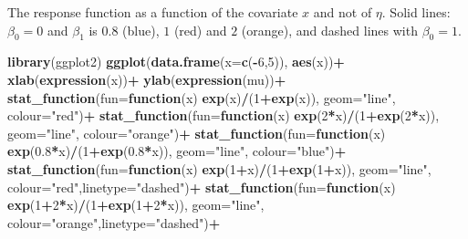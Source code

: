 \documentclass[
]{article}
\newenvironment{Shaded}{\begin{snugshade}}{\end{snugshade}}
\newcommand{\AttributeTok}[1]{\textcolor[rgb]{0.13,0.29,0.53}{#1}}
\newcommand{\ControlFlowTok}[1]{\textcolor[rgb]{0.13,0.29,0.53}{\textbf{#1}}}
\newcommand{\DecValTok}[1]{\textcolor[rgb]{0.00,0.00,0.81}{#1}}
\newcommand{\FloatTok}[1]{\textcolor[rgb]{0.00,0.00,0.81}{#1}}
\newcommand{\FunctionTok}[1]{\textcolor[rgb]{0.13,0.29,0.53}{\textbf{#1}}}
\newcommand{\NormalTok}[1]{#1}
\newcommand{\SpecialCharTok}[1]{\textcolor[rgb]{0.81,0.36,0.00}{\textbf{#1}}}
\newcommand{\StringTok}[1]{\textcolor[rgb]{0.31,0.60,0.02}{#1}}
\begin{document}
The response function as a function of the covariate \(x\) and not of
\(\eta\). Solid lines: \(\beta_0=0\) and \(\beta_1\) is \(0.8\) (blue),
\(1\) (red) and \(2\) (orange), and dashed lines with \(\beta_0=1\).

\begin{Shaded}
\begin{Highlighting}[]
\FunctionTok{library}\NormalTok{(ggplot2)}
\FunctionTok{ggplot}\NormalTok{(}\FunctionTok{data.frame}\NormalTok{(}\AttributeTok{x=}\FunctionTok{c}\NormalTok{(}\SpecialCharTok{{-}}\DecValTok{6}\NormalTok{,}\DecValTok{5}\NormalTok{)), }\FunctionTok{aes}\NormalTok{(x))}\SpecialCharTok{+}
  \FunctionTok{xlab}\NormalTok{(}\FunctionTok{expression}\NormalTok{(x))}\SpecialCharTok{+} 
  \FunctionTok{ylab}\NormalTok{(}\FunctionTok{expression}\NormalTok{(mu))}\SpecialCharTok{+}
    \FunctionTok{stat\_function}\NormalTok{(}\AttributeTok{fun=}\ControlFlowTok{function}\NormalTok{(x) }\FunctionTok{exp}\NormalTok{(x)}\SpecialCharTok{/}\NormalTok{(}\DecValTok{1}\SpecialCharTok{+}\FunctionTok{exp}\NormalTok{(x)), }\AttributeTok{geom=}\StringTok{"line"}\NormalTok{, }\AttributeTok{colour=}\StringTok{"red"}\NormalTok{)}\SpecialCharTok{+}
    \FunctionTok{stat\_function}\NormalTok{(}\AttributeTok{fun=}\ControlFlowTok{function}\NormalTok{(x) }\FunctionTok{exp}\NormalTok{(}\DecValTok{2}\SpecialCharTok{*}\NormalTok{x)}\SpecialCharTok{/}\NormalTok{(}\DecValTok{1}\SpecialCharTok{+}\FunctionTok{exp}\NormalTok{(}\DecValTok{2}\SpecialCharTok{*}\NormalTok{x)), }\AttributeTok{geom=}\StringTok{"line"}\NormalTok{, }\AttributeTok{colour=}\StringTok{"orange"}\NormalTok{)}\SpecialCharTok{+}
          \FunctionTok{stat\_function}\NormalTok{(}\AttributeTok{fun=}\ControlFlowTok{function}\NormalTok{(x) }\FunctionTok{exp}\NormalTok{(}\FloatTok{0.8}\SpecialCharTok{*}\NormalTok{x)}\SpecialCharTok{/}\NormalTok{(}\DecValTok{1}\SpecialCharTok{+}\FunctionTok{exp}\NormalTok{(}\FloatTok{0.8}\SpecialCharTok{*}\NormalTok{x)), }\AttributeTok{geom=}\StringTok{"line"}\NormalTok{, }\AttributeTok{colour=}\StringTok{"blue"}\NormalTok{)}\SpecialCharTok{+}
    \FunctionTok{stat\_function}\NormalTok{(}\AttributeTok{fun=}\ControlFlowTok{function}\NormalTok{(x) }\FunctionTok{exp}\NormalTok{(}\DecValTok{1}\SpecialCharTok{+}\NormalTok{x)}\SpecialCharTok{/}\NormalTok{(}\DecValTok{1}\SpecialCharTok{+}\FunctionTok{exp}\NormalTok{(}\DecValTok{1}\SpecialCharTok{+}\NormalTok{x)), }\AttributeTok{geom=}\StringTok{"line"}\NormalTok{, }\AttributeTok{colour=}\StringTok{"red"}\NormalTok{,}\AttributeTok{linetype=}\StringTok{"dashed"}\NormalTok{)}\SpecialCharTok{+}
    \FunctionTok{stat\_function}\NormalTok{(}\AttributeTok{fun=}\ControlFlowTok{function}\NormalTok{(x) }\FunctionTok{exp}\NormalTok{(}\DecValTok{1}\SpecialCharTok{+}\DecValTok{2}\SpecialCharTok{*}\NormalTok{x)}\SpecialCharTok{/}\NormalTok{(}\DecValTok{1}\SpecialCharTok{+}\FunctionTok{exp}\NormalTok{(}\DecValTok{1}\SpecialCharTok{+}\DecValTok{2}\SpecialCharTok{*}\NormalTok{x)), }\AttributeTok{geom=}\StringTok{"line"}\NormalTok{, }\AttributeTok{colour=}\StringTok{"orange"}\NormalTok{,}\AttributeTok{linetype=}\StringTok{"dashed"}\NormalTok{)}\SpecialCharTok{+}

\end{Highlighting}
\end{Shaded}
\end{document}
